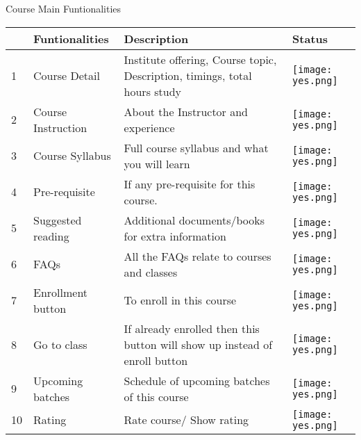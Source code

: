 Course Main Funtionalities
\begin{center}
 \begin{tabular}{|p{0.4cm}|p{4cm}|p{9cm}|p{1.3cm}|} 
 \hline
  & \textbf{Funtionalities} & \textbf{Description} & \textbf{Status} \\ [0.5ex] 
 \hline
 1 & Course Detail & Institute offering, Course topic, Description, timings, total hours study & \texttt{[image: yes.png]} \\ 
 \hline
 2 & Course Instruction & About the Instructor and experience & \texttt{[image: yes.png]} \\
 \hline
 3 & Course Syllabus & Full course syllabus and what you will learn & \texttt{[image: yes.png]} \\
 \hline
 4 & Pre-requisite & If any pre-requisite for this course. & \texttt{[image: yes.png]} \\
 \hline
 5 & Suggested reading & Additional documents/books for extra information & \texttt{[image: yes.png]} \\
 \hline
 6 & FAQs & All the FAQs relate to courses and classes & \texttt{[image: yes.png]} \\
 \hline
 7 & Enrollment button & To enroll in this course & \texttt{[image: yes.png]} \\
 \hline
 8 & Go to class & If already enrolled then this button will show up instead of enroll button & \texttt{[image: yes.png]} \\
 \hline
 9 & Upcoming batches & Schedule of upcoming batches of this course & \texttt{[image: yes.png]} \\
 \hline
 10 & Rating & Rate course/ Show rating & \texttt{[image: yes.png]} \\
 \hline
 \end{tabular}
\end{center}

